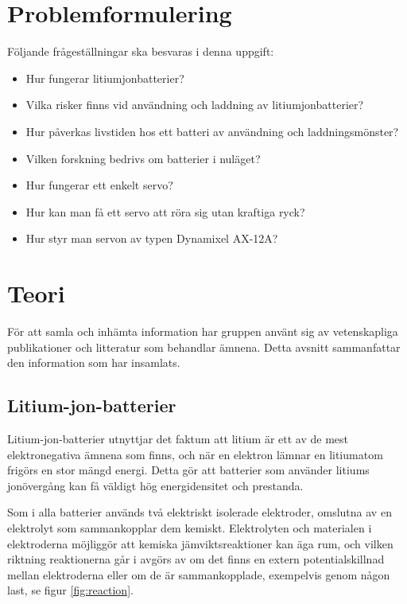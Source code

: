 \documentclass[a4paper,12pt]{article}
\begin{document}
\section{Problemformulering}
\label{sec:problem}
Följande frågeställningar ska besvaras i denna uppgift:
\begin{itemize}
\item Hur fungerar litiumjonbatterier?

\item Vilka risker finns vid användning och laddning av litiumjonbatterier?

\item Hur påverkas livstiden hos ett batteri av användning och laddningsmönster?

\item Vilken forskning bedrivs om batterier i nuläget?

\item Hur fungerar ett enkelt servo?

\item Hur kan man få ett servo att röra sig utan kraftiga ryck?

\item Hur styr man servon av typen Dynamixel AX-12A?
\end{itemize}

\section{Teori}
För att samla och inhämta information har gruppen använt sig av vetenskapliga publikationer och litteratur som behandlar ämnena. Detta avsnitt sammanfattar den information som har insamlats.

\subsection{Litium-jon-batterier}
Litium-jon-batterier utnyttjar det faktum att litium är ett av de mest elektronegativa ämnena som finns, och när en elektron lämnar en litiumatom frigörs en stor mängd energi. Detta gör att batterier som använder litiums jonövergång kan få väldigt hög energidensitet och prestanda.

Som i alla batterier används två elektriskt isolerade elektroder, omslutna av en elektrolyt som sammankopplar dem kemiskt. Elektrolyten och materialen i elektroderna möjliggör att kemiska jämviktsreaktioner kan äga rum, och vilken riktning reaktionerna går i avgörs av om det finns en extern potentialskillnad mellan elektroderna eller om de är sammankopplade, exempelvis genom någon last, se figur \ref{fig:reaction}. \cite{glaize13}
\end{document}
